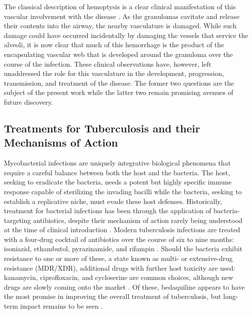 The classical description of hemoptysis is a clear clinical manifestation of this vascular involvement with the disease \citep{Middleton1997, Souders1952, Turner2003a, Turner2003b}. As the granulomas cavitate and release their contents into the airway, the nearby vasculature is damaged. While such damage could have occurred incidentally by damaging the vessels that service the alveoli, it is now clear that much of this hemorrhage is the product of the encapsulating vascular web that is developed around the granuloma over the course of the infection. These clinical observations have, however, left unaddressed the role for this vasculature in the development, progression, transmission, and treatment of the disease. The former two questions are the subject of the present work while the latter two remain promising avenues of future discovery.

\subsection{Treatments for Tuberculosis and their Mechanisms of Action}\label{treatments}

Mycobacterial infections are uniquely integrative biological phenomena that require a careful balance between both the host and the bacteria. The host, seeking to eradicate the bacteria, needs a potent but highly specific immune response capable of sterilizing the invading bacilli while the bacteria, seeking to establish a replicative niche, must evade these host defenses. Historically, treatment for bacterial infections has been through the application of bacteria-targeting antibiotics, despite their mechanism of action rarely being understood at the time of clinical introduction \citep{DAmbrosio2015, Osborne2013}. Modern tuberculosis infections are treated with a four-drug cocktail of antibiotics over the course of six to nine months: isoniazid, ethambutol, pyrazinamide, and rifampin \citep{Dorman2021, Grace2013}. Should the bacteria exhibit resistance to one or more of these, a state known as multi- or extensive-drug resistance (MDR/XDR), additional drugs with further host toxicity are used: kanamycin, ciprofloxacin, and cycloserine are common choices, although new drugs are slowly coming onto the market \citep{Quenard2017, Jang2020, Nahid2019}. Of these, bedaquiline appears to have the most promise in improving the overall treatment of tuberculosis, but long-term impact remains to be seen \citep{Mahajan2013, Pym2016, Furin2017}. 

